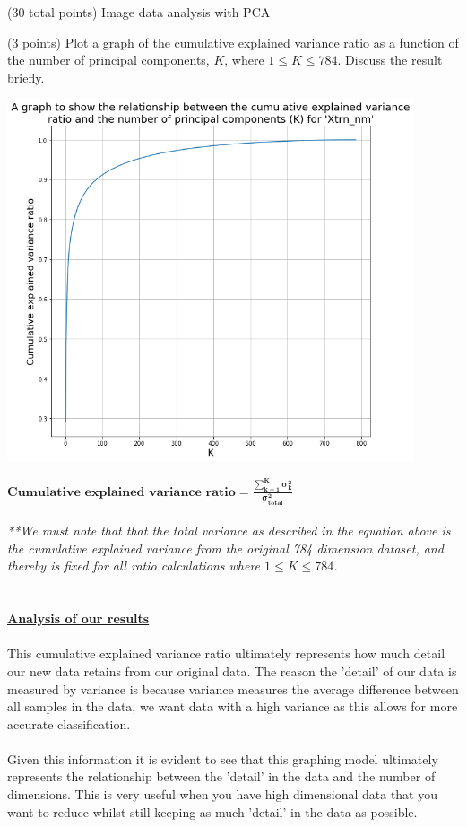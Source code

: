 \documentclass[12pt]{article}
\begin{document}
\begin{question}{(30 total points) Image data analysis with PCA}
\begin{subquestion}{(3 points)
       Plot a graph of the cumulative explained variance ratio as a function of the number of principal components, $K$, where $1\le K \le 784$.
       Discuss the result briefly.
     }
      \begin{answerbox}{54em}
        \begin{center}
         \includegraphics[width=0.9\textwidth]{images/q14.png}
        \end{center}
        \scriptsize{
        $\mathbf{Cumulative}$ $\mathbf{explained}$ $\mathbf{variance}$ $\mathbf{ratio = \frac{\sum_{k=1}^{K}\sigma_{k}^{2}}{\sigma_{total}^{2}}}$\\ 
\\
        \emph{**We must note that that the total variance as described in the equation above is the cumulative explained variance from the original 784 dimension dataset, and thereby is fixed for all ratio calculations where $1 \leq K \leq 784$.}\\
\\
\\
        \textbf{\footnotesize{\underline{Analysis of our results}}}\\
\\
        This cumulative explained variance ratio ultimately represents how much detail our new data retains from our original data. The reason the 'detail' of our data is measured by variance is because variance measures the average difference between all samples in the data, we want data with a high variance as this allows for more accurate classification.\\
\\
        Given this information it is evident to see that this graphing model ultimately represents the relationship between the 'detail' in the data and the number of dimensions. This is very useful when you have high dimensional data that you want to reduce whilst still keeping as much 'detail' in the data as possible.\\
}
\end{answerbox}
\end{subquestion}
\end{question}
\end{document}
